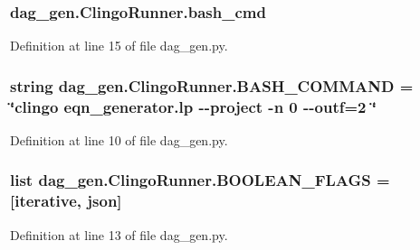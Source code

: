 \subsubsection[{bash\+\_\+cmd}]{\setlength{\rightskip}{0pt plus 5cm}dag\+\_\+gen.\+Clingo\+Runner.\+bash\+\_\+cmd}\label{classdag__gen_1_1_clingo_runner_a492a99985894a1ae69f7b38af7d285e5}


Definition at line 15 of file dag\+\_\+gen.\+py.

\hypertarget{classdag__gen_1_1_clingo_runner_ae58afdbd0d16c11d9a6319117d9a3593}{}
\subsubsection[{B\+A\+S\+H\+\_\+\+C\+O\+M\+M\+A\+N\+D}]{\setlength{\rightskip}{0pt plus 5cm}string dag\+\_\+gen.\+Clingo\+Runner.\+B\+A\+S\+H\+\_\+\+C\+O\+M\+M\+A\+N\+D = \char`\"{}clingo eqn\+\_\+generator.\+lp -\/-\/project -\/n 0 -\/-\/outf=2 \char`\"{}\hspace{0.3cm}{\ttfamily [static]}}\label{classdag__gen_1_1_clingo_runner_ae58afdbd0d16c11d9a6319117d9a3593}


Definition at line 10 of file dag\+\_\+gen.\+py.

\hypertarget{classdag__gen_1_1_clingo_runner_a02e60fad8150929b05e3f7ea78b96c7f}{}
\subsubsection[{B\+O\+O\+L\+E\+A\+N\+\_\+\+F\+L\+A\+G\+S}]{\setlength{\rightskip}{0pt plus 5cm}list dag\+\_\+gen.\+Clingo\+Runner.\+B\+O\+O\+L\+E\+A\+N\+\_\+\+F\+L\+A\+G\+S = \mbox{[}\textquotesingle{}iterative\textquotesingle{}, \textquotesingle{}json\textquotesingle{}\mbox{]}\hspace{0.3cm}{\ttfamily [static]}}\label{classdag__gen_1_1_clingo_runner_a02e60fad8150929b05e3f7ea78b96c7f}


Definition at line 13 of file dag\+\_\+gen.\+py.

